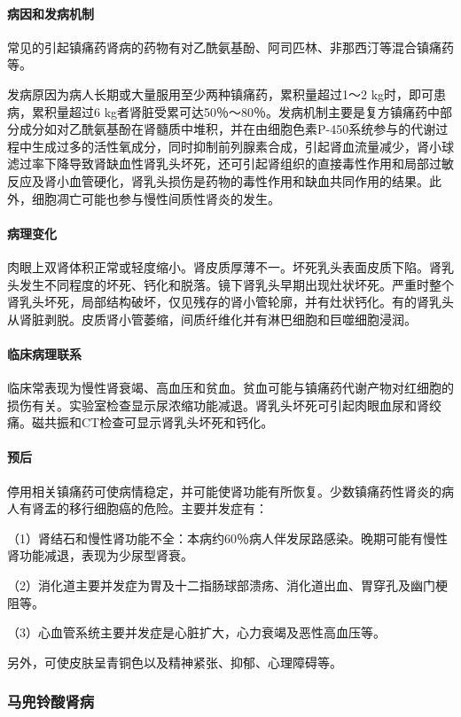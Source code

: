 \paragraph{病因和发病机制}
常见的引起镇痛药肾病的药物有对乙酰氨基酚、阿司匹林、非那西汀等混合镇痛药等。

发病原因为病人长期或大量服用至少两种镇痛药，累积量超过1～2
kg时，即可患病，累积量超过6
kg者肾脏受累可达50％～80％。发病机制主要是复方镇痛药中部分成分如对乙酰氨基酚在肾髓质中堆积，并在由细胞色素P-450系统参与的代谢过程中生成过多的活性氧成分，同时抑制前列腺素合成，引起肾血流量减少，肾小球滤过率下降导致肾缺血性肾乳头坏死，还可引起肾组织的直接毒性作用和局部过敏反应及肾小血管硬化，肾乳头损伤是药物的毒性作用和缺血共同作用的结果。此外，细胞凋亡可能也参与慢性间质性肾炎的发生。

\paragraph{病理变化}
肉眼上双肾体积正常或轻度缩小。肾皮质厚薄不一。坏死乳头表面皮质下陷。肾乳头发生不同程度的坏死、钙化和脱落。镜下肾乳头早期出现灶状坏死。严重时整个肾乳头坏死，局部结构破坏，仅见残存的肾小管轮廓，并有灶状钙化。有的肾乳头从肾脏剥脱。皮质肾小管萎缩，间质纤维化并有淋巴细胞和巨噬细胞浸润。

\paragraph{临床病理联系}
临床常表现为慢性肾衰竭、高血压和贫血。贫血可能与镇痛药代谢产物对红细胞的损伤有关。实验室检查显示尿浓缩功能减退。肾乳头坏死可引起肉眼血尿和肾绞痛。磁共振和CT检查可显示肾乳头坏死和钙化。

\paragraph{预后}
停用相关镇痛药可使病情稳定，并可能使肾功能有所恢复。少数镇痛药性肾炎的病人有肾盂的移行细胞癌的危险。主要并发症有：

（1）肾结石和慢性肾功能不全：本病约60％病人伴发尿路感染。晚期可能有慢性肾功能减退，表现为少尿型肾衰。

（2）消化道主要并发症为胃及十二指肠球部溃疡、消化道出血、胃穿孔及幽门梗阻等。

（3）心血管系统主要并发症是心脏扩大，心力衰竭及恶性高血压等。

另外，可使皮肤呈青铜色以及精神紧张、抑郁、心理障碍等。

\subsubsection{马兜铃酸肾病}

